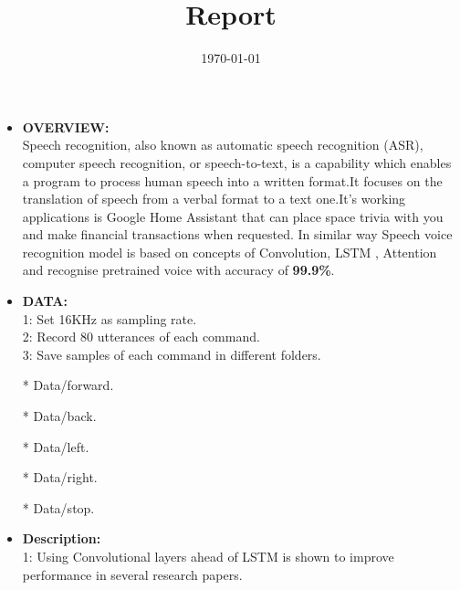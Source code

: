 \documentclass{article}
\begin{document}
\title{Report}
\date{\today}
\maketitle
\begin{itemize}


\item{\textbf{OVERVIEW:}}\\

Speech recognition, also known as automatic speech recognition (ASR),\vspace{3} computer speech recognition, or speech-to-text, is a \vspace{3}capability which enables a program to process human speech\vspace{3} into a written format.It focuses on the translation of\vspace{3} speech from a verbal format to a text one.It's working applications is\vspace{3} Google Home Assistant that can place space trivia with you and make financial transactions when requested.\vspace{3} In similar way Speech voice\vspace{3} recognition model is based on concepts of Convolution, LSTM , Attention and recognise pretrained voice with accuracy of \textbf{99.9\%}.\\

\item{\textbf{DATA:}}\\

1: Set 16KHz as sampling rate.\\
2: Record 80 utterances of each command.\\
3: Save samples of each command in different folders.\\

\item[*]{Data/forward}.
\item[*]{Data/back}.
\item[*]{Data/left}.
\item[*]{Data/right}.
\item[*]{Data/stop}.\\
\newpage

\item{\textbf{Description:}}\\

1: Using Convolutional layers ahead of LSTM is shown to improve performance in several research papers.\\


\end{itemize}
\end{document}
